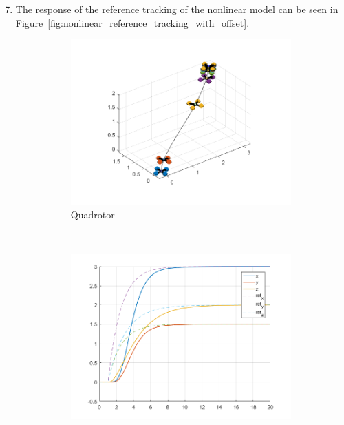 \documentclass[11pt]{article}
\begin{document}
\begin{enumerate}
    \setcounter{enumi}{6}
    \item The response of the reference tracking of the nonlinear model can be
    seen in Figure~\ref{fig:nonlinear_reference_tracking_with_offset}.
    \begin{figure}[ht]
        \centering
        \begin{subfigure}[c]{0.3\linewidth}
            \centering
            \includegraphics[width=\linewidth]{Plots_07_NonlinearModel_ReferenceTracking/01}
            \caption{Quadrotor}
        \end{subfigure}
        ~
        \begin{subfigure}[c]{0.3\linewidth}
            \centering
            \includegraphics[width=\linewidth]{Plots_07_NonlinearModel_ReferenceTracking/02}

\end{subfigure}
\end{figure}
\end{enumerate}
\end{document}
